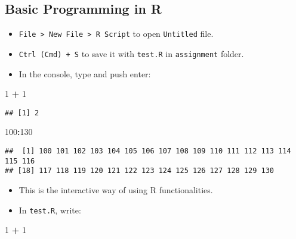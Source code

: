 \documentclass[
]{book}
\newenvironment{Shaded}{\begin{snugshade}}{\end{snugshade}}
\newcommand{\DecValTok}[1]{\textcolor[rgb]{0.00,0.00,0.81}{#1}}
\newcommand{\OperatorTok}[1]{\textcolor[rgb]{0.81,0.36,0.00}{\textbf{#1}}}
\newcommand{\StringTok}[1]{\textcolor[rgb]{0.31,0.60,0.02}{#1}}
\providecommand{\tightlist}{%
  \setlength{\itemsep}{0pt}\setlength{\parskip}{0pt}}
\begin{document}
\hypertarget{basic-programming-in-r}{%
\subsection{Basic Programming in R}\label{basic-programming-in-r}}

\begin{itemize}
\tightlist
\item
  \texttt{File\ \textgreater{}\ New\ File\ \textgreater{}\ R\ Script} to open \texttt{Untitled} file.
\item
  \texttt{Ctrl\ (Cmd)\ +\ S} to save it with \texttt{test.R} in \texttt{assignment} folder.
\item
  In the console, type and push enter:
\end{itemize}

\begin{Shaded}
\begin{Highlighting}[]
\DecValTok{1} \OperatorTok{+}\StringTok{ }\DecValTok{1}
\end{Highlighting}
\end{Shaded}

\begin{verbatim}
## [1] 2
\end{verbatim}

\begin{Shaded}
\begin{Highlighting}[]
\DecValTok{100}\OperatorTok{:}\DecValTok{130}
\end{Highlighting}
\end{Shaded}

\begin{verbatim}
##  [1] 100 101 102 103 104 105 106 107 108 109 110 111 112 113 114 115 116
## [18] 117 118 119 120 121 122 123 124 125 126 127 128 129 130
\end{verbatim}

\begin{itemize}
\tightlist
\item
  This is the interactive way of using R functionalities.
\item
  In \texttt{test.R}, write:
\end{itemize}

\begin{Shaded}
\begin{Highlighting}[]
\DecValTok{1} \OperatorTok{+}\StringTok{ }\DecValTok{1}
\end{Highlighting}
\end{Shaded}
\end{document}
